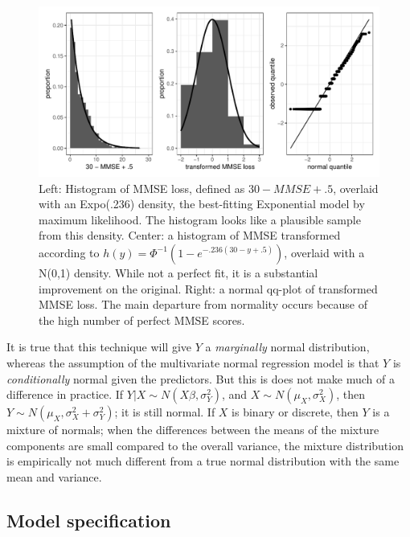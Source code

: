 \documentclass[12pt]{article}
\begin{document}
\begin{figure}[H]
\centering
\includegraphics[width=\linewidth]{figures/mmse_after}
\caption{Left: Histogram of MMSE loss, defined as $30 - MMSE + .5$, overlaid with an Expo(.236) density, the best-fitting Exponential model by maximum likelihood. The histogram looks like a plausible sample from this density. Center: a histogram of MMSE transformed according to $h(y) = \Phi^{-1}(1 - e^{-.236(30-y+.5)})$, overlaid with a N(0,1) density. While not a perfect fit, it is a substantial improvement on the original. Right: a normal qq-plot of transformed MMSE loss. The main departure from normality occurs because of the high number of perfect MMSE scores.}
\end{figure}

It is true that this technique will give $Y$ a \textit{marginally} normal distribution, whereas the assumption of the multivariate normal regression model is that $Y$ is \textit{conditionally} normal given the predictors. But this is does not make much of a difference in practice. If $Y|X \sim N(X\beta, \sigma_{Y}^{2})$, and $X \sim N(\mu_X, \sigma_{X}^{2})$, then $Y \sim N(\mu_X, \sigma_{X}^{2} + \sigma_{Y}^{2})$; it is still normal. If $X$ is binary or discrete, then $Y$ is a mixture of normals; when the differences between the means of the mixture components are small compared to the overall variance, the mixture distribution is empirically not much different from a true normal distribution with the same mean and variance. 

\pagebreak
\subsection{Model specification}
\end{document}
